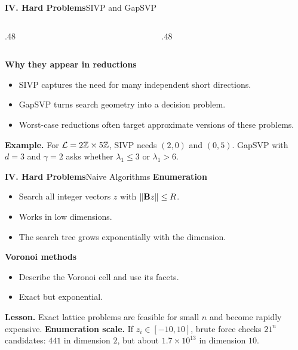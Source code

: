 \begin{frame}[shrink=8]{\textbf{IV. Hard Problems}}{SIVP and GapSVP}
\begin{columns}[T,onlytextwidth]
\begin{column}{.48\textwidth}
\end{column}
\begin{column}{.48\textwidth}
\end{column}
\end{columns}
\bigskip
\textcolor{TealDarkCyan}{\textbf{Why they appear in reductions}}
\begin{itemize}
  \item SIVP captures the need for many independent short directions.
  \item GapSVP turns search geometry into a decision problem.
  \item Worst-case reductions often target approximate versions of these problems.
\end{itemize}
\textbf{Example.}\; For $\mathcal{L}=2\mathbb{Z}\times5\mathbb{Z}$, SIVP needs $(2,0)$ and $(0,5)$.
GapSVP with $d=3$ and $\gamma=2$ asks whether $\lambda_1\le3$ or $\lambda_1>6$.
\end{frame}

\begin{frame}[shrink=5]{\textbf{IV. Hard Problems}}{Naive Algorithms}
\textcolor{TealDarkCyan}{\textbf{Enumeration}}
\begin{itemize}
  \item Search all integer vectors $z$ with $\left\lVert \mathbf{B}z\right\rVert\le R$.
  \item Works in low dimensions.
  \item The search tree grows exponentially with the dimension.
\end{itemize}
\bigskip
\textcolor{TealDarkCyan}{\textbf{Voronoi methods}}
\begin{itemize}
  \item Describe the Voronoi cell and use its facets.
  \item Exact but exponential.
\end{itemize}
\bigskip
\textbf{\color{red}Lesson.}\; Exact lattice problems are feasible for small $n$ and become rapidly expensive.
\textbf{Enumeration scale.}\; If $z_i\in[-10,10]$, brute force checks $21^n$ candidates:
$441$ in dimension $2$, but about $1.7\times10^{13}$ in dimension $10$.
\end{frame}

